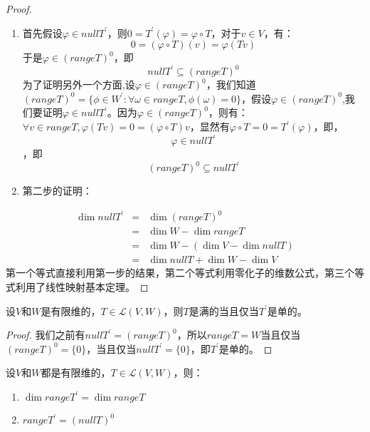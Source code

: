 \documentclass[10pt,a4paper,UTF8]{article}
\begin{document}
\begin{proof}
\begin{enumerate}
\item 首先假设\(\varphi \in nullT^{'}\)，则\(0 = T^{'}(\varphi) = \varphi\circ T\)，对于\(v\in V\)，有：\[0 = (\varphi\circ T)(v) = \varphi(Tv)\]于是\(\varphi \in (rangeT)^{0}\)，即\[nullT^{'}\subseteq (rangeT)^{0}\] 为了证明另外一个方面,设\(\varphi\in (rangeT)^{0}\)，我们知道\((rangeT)^{0} =\{\phi\in W^{'}:\forall \omega\in rangeT, \phi(\omega) = 0\}\)，假设\(\varphi\in (rangeT)^{0}\),我们要证明\(\varphi \in nullT^{'}\)。因为\(\varphi \in (rangeT)^{0}\)，则有：\(\forall v \in rangeT, \varphi(Tv) = 0 = (\varphi \circ T)v\)，显然有\(\varphi\circ T = 0 = T^{'}(\varphi)\)，即，\[\varphi \in nullT^{'}\]，即\[(rangeT)^{0} \subseteq nullT^{'}\]
\item 第二步的证明：
\end{enumerate}
\begin{eqnarray}
\label{eq:5}
\dim nullT^{'}&=&\dim (rangeT)^{0} \\
&=& \dim W - \dim rangeT \\
&=& \dim W - (\dim V - \dim nullT) \\
&=& \dim nullT + \dim W - \dim V
\end{eqnarray}
第一个等式直接利用第一步的结果，第二个等式利用零化子的维数公式，第三个等式利用了线性映射基本定理。 
\end{proof}

\begin{theorem}
设\(V\)和\(W\)是有限维的，\(T\in \mathcal{L}(V,W)\)，则\(T\)是满的当且仅当\(T^{'}\)是单的。
\end{theorem}

\begin{proof}
我们之前有\(nullT^{'} = (rangeT)^{0}\)，所以\(rangeT = W\)当且仅当\((rangeT)^{0} = \{0\}\)，当且仅当\(nullT^{'} = \{0\}\)，即\(T^{'}\)是单的。
\end{proof}

\begin{theorem}
设\(V\)和\(W\)都是有限维的，\(T\in \mathcal{L}(V,W)\)，则：
\begin{enumerate}
\item \(\dim rangeT^{'} = \dim rangeT\)
\item \(rangeT^{'} = (nullT)^{0}\)
\end{enumerate}
\end{theorem}
\end{document}
